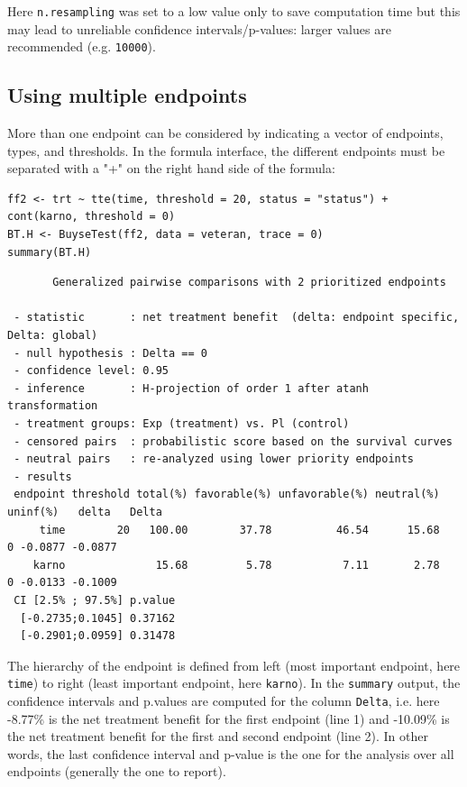 \documentclass[12pt]{article}
\begin{document}
Here \texttt{n.resampling} was set to a low value only to save computation
time but this may lead to unreliable confidence intervals/p-values:
larger values are recommended (e.g. \texttt{10000}).



\subsection{Using multiple endpoints}
\label{sec:orgda2d106}

More than one endpoint can be considered by indicating a vector of
endpoints, types, and thresholds. In the formula interface, the
different endpoints must be separated with a "+" on the right hand
side of the formula:
\lstset{language=r,label= ,caption= ,captionpos=b,numbers=none}
\begin{lstlisting}
ff2 <- trt ~ tte(time, threshold = 20, status = "status") + cont(karno, threshold = 0)
BT.H <- BuyseTest(ff2, data = veteran, trace = 0)
summary(BT.H)
\end{lstlisting}

\begin{verbatim}
       Generalized pairwise comparisons with 2 prioritized endpoints

 - statistic       : net treatment benefit  (delta: endpoint specific, Delta: global) 
 - null hypothesis : Delta == 0 
 - confidence level: 0.95 
 - inference       : H-projection of order 1 after atanh transformation 
 - treatment groups: Exp (treatment) vs. Pl (control) 
 - censored pairs  : probabilistic score based on the survival curves
 - neutral pairs   : re-analyzed using lower priority endpoints
 - results
 endpoint threshold total(%) favorable(%) unfavorable(%) neutral(%) uninf(%)   delta   Delta
     time        20   100.00        37.78          46.54      15.68        0 -0.0877 -0.0877
    karno              15.68         5.78           7.11       2.78        0 -0.0133 -0.1009
 CI [2.5% ; 97.5%] p.value 
  [-0.2735;0.1045] 0.37162 
  [-0.2901;0.0959] 0.31478
\end{verbatim}

The hierarchy of the endpoint is defined from left (most important
endpoint, here \texttt{time}) to right (least important endpoint, here
\texttt{karno}). In the \texttt{summary} output, the confidence intervals and
p.values are computed for the column \texttt{Delta}, i.e. here -8.77\% is the
net treatment benefit for the first endpoint (line 1) and -10.09\% is the net
treatment benefit for the first and second endpoint (line 2). In other words,
the last confidence interval and p-value is the one for the analysis
over all endpoints (generally the one to report).
\end{document}
